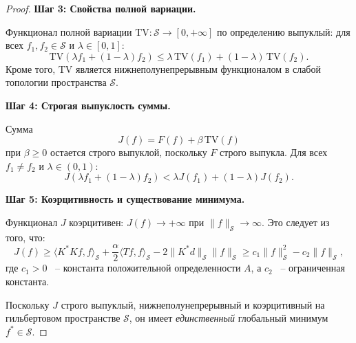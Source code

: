 \documentclass[a4paper,14pt,oneside,openany]{extarticle}
\begin{document}
\begin{proof}
\textbf{Шаг 3: Свойства полной вариации.}

Функционал полной вариации $\mathrm{TV}:\mathcal{S}\to[0,+\infty]$ по определению выпуклый: 
для всех $f_1, f_2 \in \mathcal{S}$ и $\lambda \in [0,1]$:
\begin{equation}
    \mathrm{TV}(\lambda f_1 + (1-\lambda)f_2) \leq \lambda \,\mathrm{TV}(f_1) + (1-\lambda)\,\mathrm{TV}(f_2).
\end{equation}
Кроме того, $\mathrm{TV}$ является нижнеполунепрерывным функционалом в слабой топологии 
пространства $\mathcal{S}$.

\textbf{Шаг 4: Строгая выпуклость суммы.}

Сумма 
\begin{equation}
    J(f) = F(f) + \beta \,\mathrm{TV}(f)
\end{equation}
при $\beta \geq 0$ остается строго выпуклой, поскольку $F$ строго выпукла. 
Для всех $f_1 \neq f_2$ и $\lambda \in (0,1)$:
\begin{equation}
    J(\lambda f_1 + (1-\lambda)f_2) < \lambda J(f_1) + (1-\lambda)J(f_2).
\end{equation}


\textbf{Шаг 5: Коэрцитивность и существование минимума.}

Функционал $J$ коэрцитивен: $J(f) \to +\infty$ при $\|f\|_{\mathcal{S}} \to \infty$. 
Это следует из того, что:
\begin{equation}
    J(f) \geq \langle K^*K f, f\rangle_{\mathcal{S}} + \frac{\alpha}{2}\langle T f, f\rangle_{\mathcal{S}} - 
    2\|K^*d\|_{\mathcal{S}} \|f\|_{\mathcal{S}} \geq c_1 \|f\|_{\mathcal{S}}^2 - c_2 \|f\|_{\mathcal{S}},
\end{equation}
где $c_1 > 0$ ~-- константа положительной определенности $A$, а $c_2$ ~-- ограниченная константа.

Поскольку $J$ строго выпуклый, нижнеполунепрерывный и коэрцитивный на гильбертовом пространстве $\mathcal{S}$, 
он имеет \textit{единственный} глобальный минимум $f^* \in \mathcal{S}$.
\end{proof}
\end{document}
